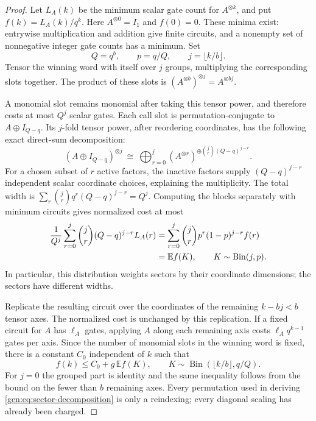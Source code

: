 \begin{proof}
Let $L_A(k)$ be the minimum scalar gate count for $A^{\otimes k}$,
and put $f(k)=L_A(k)/q^k$.  Here $A^{\otimes0}=I_1$ and $f(0)=0$.
These minima exist: entrywise multiplication and addition give finite
circuits, and a nonempty set of nonnegative integer gate counts has
a minimum.  Set
\[
Q=q^b,\qquad p=q/Q,\qquad j=\lfloor k/b\rfloor.
\]
Tensor the winning word with itself over $j$ groups, multiplying the
corresponding slots together.  The product of these slots is
$(A^{\otimes b})^{\otimes j}=A^{\otimes bj}$.

A monomial slot remains monomial after taking this tensor power, and
therefore costs at most $Q^j$ scalar gates.  Each call slot is
permutation-conjugate to $A\oplus I_{Q-q}$.  Its $j$-fold tensor power,
after reordering coordinates, has the following exact direct-sum
decomposition:
\begin{equation}\label{gen:eq:sector-decomposition}
(A\oplus I_{Q-q})^{\otimes j}
\ \cong\ 
\bigoplus_{r=0}^{j}
\left(A^{\otimes r}\right)^{\oplus
             \binom jr(Q-q)^{j-r}}.
\end{equation}
For a chosen subset of $r$ active factors, the inactive factors supply
$(Q-q)^{j-r}$ independent scalar coordinate choices, explaining the
multiplicity.  The total width is
$\sum_r\binom jr q^r(Q-q)^{j-r}=Q^j$.  Computing the blocks separately
with minimum circuits gives normalized cost at most
\begin{align}
\frac{1}{Q^j}\sum_{r=0}^j
  \binom jr(Q-q)^{j-r}L_A(r)
 &=\sum_{r=0}^j\binom jr p^r(1-p)^{j-r}f(r)\notag\\
 &=\mathbb E f(K),\qquad K\sim\operatorname{Bin}(j,p).
 \label{gen:eq:weighted-cost}
\end{align}
In particular, this distribution weights sectors by their coordinate
dimensions; the sectors have different widths.

Replicate the resulting circuit over the coordinates of the remaining
$k-bj<b$ tensor axes.  The normalized cost is unchanged by this
replication.  If a fixed circuit for $A$ has $\ell_A$ gates, applying
$A$ along each remaining axis costs $\ell_Aq^{k-1}$ gates per axis.
Since the number of monomial slots in the winning word is fixed,
there is a constant $C_0$ independent of $k$ such that
\begin{equation}\label{gen:eq:recurrence}
f(k)\leq C_0+g\,\mathbb E f(K),
\qquad K\sim\operatorname{Bin}(\lfloor k/b\rfloor,q/Q).
\end{equation}
For $j=0$ the grouped part is identity and the same inequality follows
from the bound on the fewer than $b$ remaining axes.  Every permutation
used in deriving \cref{gen:eq:sector-decomposition} is only a
reindexing; every diagonal scaling has already been charged.


\end{proof}
